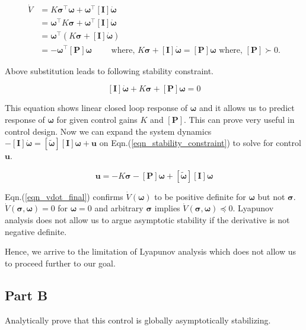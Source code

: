 \documentclass{article}
\begin{document}
\begin{equation}
  \label{eqn_vdot_final}
  \begin{split}
    \dot{V}&=K\bm{\sigma}^{\intercal}\bm{\omega}+\bm{\omega}^{\intercal}[\bm{I}]\dot{\bm{\omega}}\\
    &=\bm{\omega}^{\intercal}K\bm{\sigma}+\bm{\omega}^{\intercal}[\bm{I}]\dot{\bm{\omega}}\\
    &=\bm{\omega}^{\intercal}(K\bm{\sigma}+[\bm{I}]\dot{\bm{\omega}})\\
    &=-\bm{\omega}^{\intercal}[\bm{P}]\bm{\omega}\quad\quad\text{ where, }K\bm{\sigma}+[\bm{I}]\dot{\bm{\omega}}=[\bm{P}]\bm{\omega}\text{ where, }[\bm{P}]\succ0.
  \end{split}
\end{equation}

 Above substitution leads to following stability constraint.

\begin{equation}
  \label{eqn_stability_constraint}
 [\bm{I}]\dot{\bm{\omega}} + K\bm{\sigma} + [\bm{P}]\bm{\omega} = 0
\end{equation}

This equation shows linear closed loop response of $\bm{\omega}$ and it allows us to predict response of $\bm{\omega}$ for given control gains $K$ and $[\bm{P}]$. This can prove very useful in control design. Now we can expand the system dynamics $-[\bm{I}]\dot{\bm{\omega}}=[\tilde{\bm{\omega}}][\bm{I}]\bm{\omega} + \bm{u}$ on Eqn.(\ref{eqn_stability_constraint}) to solve for control $\bm{u}$.

\begin{equation}
  \label{eqn_control_law}
  \bm{u}=-K\bm{\sigma}-[\bm{P}]\bm{\omega}+[\tilde{\bm{\omega}}][\bm{I}]\bm{\omega}  
\end{equation}

Eqn.(\ref{eqn_vdot_final}) confirms $\dot{V}(\bm{\omega})$ to be positive definite for $\bm{\omega}$ but not $\bm{\sigma}$. $\dot{V}(\bm{\sigma},\bm{\omega})=0$ for $\bm{\omega}=0$ and arbitrary $\bm{\sigma}$ implies $\dot{V}(\bm{\sigma},\bm{\omega})\preceq0$. Lyapunov analysis does not allow us to argue asymptotic stability if the derivative is not negative definite.

Hence, we arrive to the limitation of Lyapunov analysis which does not allow us to proceed further to our goal. 

\subsection*{Part B}
Analytically prove that this control is globally asymptotically stabilizing.
\end{document}
